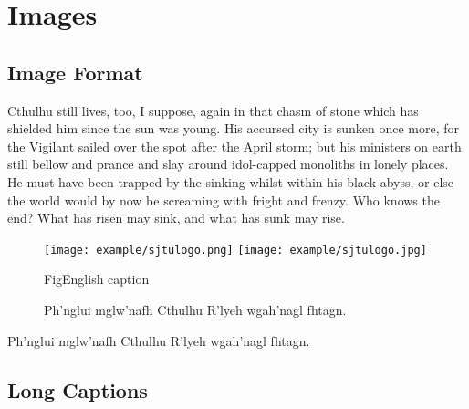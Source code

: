\section{Images}
\label{sec:insertimage}

\subsection{Image Format}
\label{sec:imageformat}

Cthulhu still lives, too, I suppose, again in that chasm of stone which has shielded him since the sun was young. His accursed city is sunken once more, for the Vigilant sailed over the spot after the April storm; but his ministers on earth still bellow and prance and slay around idol-capped monoliths in lonely places. He must have been trapped by the sinking whilst within his black abyss, or else the world would by now be screaming with fright and frenzy. Who knows the end? What has risen may sink, and what has sunk may rise. 

\begin{figure}[!htp]
  \centering
  \texttt{[image: example/sjtulogo.png]}
  \hspace{1cm}
  \texttt{[image: example/sjtulogo.jpg]}
  \caption[fig:SRR]{Ph'nglui mglw'nafh Cthulhu R'lyeh wgah'nagl fhtagn.}{}{Fig}{English caption}
\end{figure}

% 

Ph'nglui mglw'nafh Cthulhu R'lyeh wgah'nagl fhtagn.

\subsection{Long Captions}
\label{sec:longcaption}

